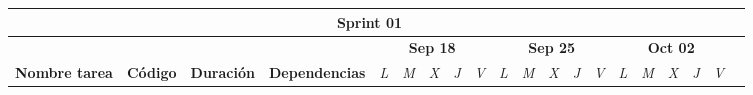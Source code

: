     \begin{longtable}[c]{llclllllllllllllllll}
        \hline
        \multicolumn{19}{c}{\cellcolor[HTML]{8EA9D8}\textbf{Sprint 01}}                                                                                                                                                                                                                                                                                                                                                                                                                                                                                                                                                                                                                                                                                                                                                                                                                                                                &  \\ \hline
        \endfirsthead
        \endhead
        \multicolumn{1}{|c|}{\cellcolor[HTML]{FFFFFF}}                                                                          & \multicolumn{1}{c|}{\cellcolor[HTML]{FFFFFF}}                                  & \multicolumn{1}{c|}{\cellcolor[HTML]{FFFFFF}}                                    & \multicolumn{1}{c|}{\cellcolor[HTML]{FFFFFF}}                                        & \multicolumn{5}{c|}{\cellcolor[HTML]{FFFFFF}\textbf{Sep 18}}                                                                                                            & \multicolumn{5}{c|}{\cellcolor[HTML]{FFFFFF}\textbf{Sep 25}}                                                                                                            & \multicolumn{5}{c|}{\cellcolor[HTML]{FFFFFF}\textbf{Oct 02}}                                                                                                                          &  \\ \cline{5-19}
        \multicolumn{1}{|c|}{\multirow{-2}{*}{\cellcolor[HTML]{FFFFFF}\textbf{Nombre tarea}}}                                   & \multicolumn{1}{c|}{\multirow{-2}{*}{\cellcolor[HTML]{FFFFFF}\textbf{Código}}} & \multicolumn{1}{c|}{\multirow{-2}{*}{\cellcolor[HTML]{FFFFFF}\textbf{Duración}}} & \multicolumn{1}{c|}{\multirow{-2}{*}{\cellcolor[HTML]{FFFFFF}\textbf{Dependencias}}} & \multicolumn{1}{l|}{\textit{L}} & \multicolumn{1}{l|}{\textit{M}} & \multicolumn{1}{l|}{\textit{X}} & \multicolumn{1}{l|}{\textit{J}} & \multicolumn{1}{l|}{\textit{V}} & \multicolumn{1}{l|}{\textit{L}} & \multicolumn{1}{l|}{\textit{M}} & \multicolumn{1}{l|}{\textit{X}} & \multicolumn{1}{l|}{\textit{J}} & \multicolumn{1}{l|}{\textit{V}} & \multicolumn{1}{l|}{\textit{L}} & \multicolumn{1}{l|}{\textit{M}} & \multicolumn{1}{l|}{\textit{X}} & \multicolumn{1}{l|}{\textit{J}} & \multicolumn{1}{l|}{\textit{V}}               &  \\ \cline{1-19}

\end{longtable}
